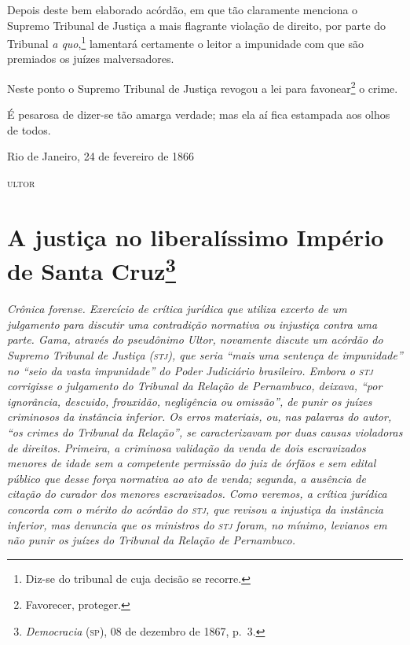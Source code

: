 Depois deste bem elaborado acórdão, em que tão
claramente menciona o Supremo Tribunal de Justiça a mais flagrante
violação de direito, por parte do Tribunal \emph{a quo},\footnote{
  Diz-se do tribunal de cuja decisão se recorre.} lamentará certamente
o leitor a impunidade com que são premiados os juízes malversadores.

Neste ponto o Supremo Tribunal de Justiça revogou a lei para
favonear\footnote{Favorecer, proteger.} o crime.

É pesarosa de dizer-se tão amarga verdade; mas ela aí fica estampada aos
olhos de todos.

\begin{flushright}
Rio de Janeiro, 24 de fevereiro de 1866

\textsc{ultor}
\end{flushright}

\chapter{A justiça no liberalíssimo Império de Santa Cruz\footnote{\emph{Democracia} (\textsc{sp}), 08 de dezembro de 1867, p.~3.}}

\begin{didascalia}\itshape
Crônica forense. Exercício de crítica jurídica que utiliza excerto de um
julgamento para discutir uma contradição normativa ou injustiça contra
uma parte. Gama, através do pseudônimo Ultor, novamente discute
um acórdão do Supremo Tribunal de Justiça (\textsc{stj}), que seria ``mais uma
sentença de impunidade'' no ``seio da vasta impunidade'' do Poder
Judiciário brasileiro. Embora o \textsc{stj} corrigisse o julgamento do Tribunal
da Relação de Pernambuco, deixava, ``por ignorância, descuido, frouxidão,
negligência ou omissão'', de punir os juízes criminosos da instância
inferior. Os erros materiais, ou, nas palavras do autor, ``os crimes do
Tribunal da Relação'', se caracterizavam por duas causas violadoras de
direitos. Primeira, a criminosa validação da venda de dois escravizados
menores de idade sem a competente permissão do juiz de órfãos e sem
edital público que desse força normativa ao ato de venda; segunda, a
ausência de citação do curador dos menores escravizados. Como veremos, a
crítica jurídica concorda com o mérito do acórdão do \textsc{stj}, que revisou a
injustiça da instância inferior, mas denuncia que os ministros do \textsc{stj}
foram, no mínimo, levianos em não punir os juízes do Tribunal da Relação
de Pernambuco.
\end{didascalia}



